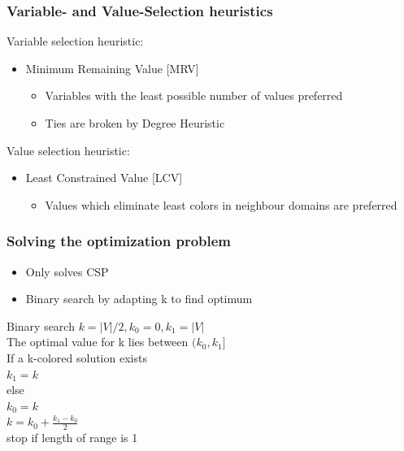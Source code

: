 \documentclass{beamer}
\begin{document}
\begin{frame}
    \frametitle{Variable- and Value-Selection heuristics}
	Variable selection heuristic:
	\begin{itemize}
	\item{Minimum Remaining Value [MRV]}
          \begin{itemize}
          \item{Variables with the least possible number of values preferred}
          \item{Ties are broken by Degree Heuristic}
          \end{itemize}
	\end{itemize}
	Value selection heuristic:
	\begin{itemize}
	\item{Least Constrained Value [LCV]}
          \begin{itemize}
          \item{Values which eliminate least colors in neighbour domains are preferred}
          \end{itemize}
          
	\end{itemize}
  \end{frame}

\begin{frame}
    \frametitle{Solving the optimization problem}
    \begin{itemize}
    \item{Only solves CSP}
	\item{Binary search by adapting k to find optimum}
	\end{itemize}
	\begin{block}{Binary search}
	$k = |V|/2, k_0 = 0, k_1 = |V|$\\
	The optimal value for k lies between $(k_0,k_1]$\\
	If a k-colored solution exists\\
	\quad $k_1 = k$\\
	else\\
	\quad $k_0 = k$\\
	$k = k_0 + \frac{k_1 - k_0}{2}$\\
	stop if length of range is 1
	\end{block}
   \end{frame}
\end{document}
